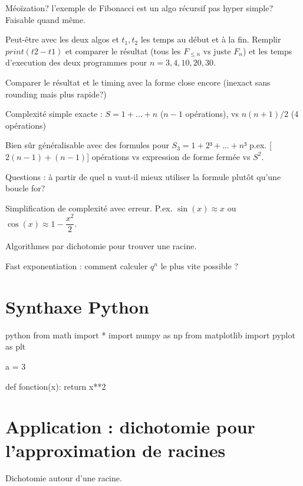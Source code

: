 Méoïzation? l'exemple de Fibonacci est un algo récursif pas hyper simple? Faisable quand même.

Peut-être avec les deux algos et $t_1, t_2$ les temps au début et à la fin. Remplir $print(t2-t1)$ et comparer le résultat (tous les $F_{\leq n}$ vs juste $F_n$) et les temps d'execution des deux programmes pour $n=3, 4, 10, 20, 30$.

Comparer le résultat et le timing avec la forme close encore (inexact sans rounding mais plus rapide?)

Complexité simple exacte : $S = 1 + ... + n$ ($n-1$ opérations), vs $n(n+1)/2$ (4 opérations)

Bien sûr généralisable avec des formules pour $S_3 = 1+2³+...+n³$ p.ex. [$2(n-1) + (n-1)$] opérations vs expression de forme fermée vs $S^2$.

Questions : à partir de quel n vaut-il mieux utiliser la formule plutôt qu'une boucle for?

Simplification de complexité avec erreur. P.ex. $\sin(x) \approx x$ ou $\cos(x) \approx 1 - \dfrac{x^2}2$.

Algorithmes par dichotomie pour trouver une racine.

Fast exponentiation : comment calculer $q^n$ le plus vite possible ?


\section{Synthaxe Python}

\begin{mintedbox}{python}
from math import *
import numpy as np
from matplotlib import pyplot as plt

a = 3

def fonction(x):
	return x**2
\end{mintedbox}

\section{Application : dichotomie pour l'approximation de racines}

\IncMargin{1em}
\begin{algorithm}
%
%
%
	\BlankLine
\caption{Dichotomie autour d'une racine.}\label{algo:seuil-geom}
\end{algorithm}\DecMargin{1em} 


